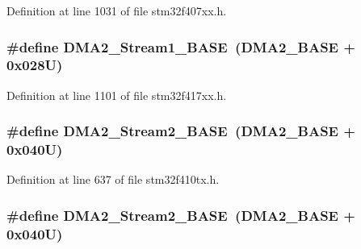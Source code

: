 Definition at line 1031 of file stm32f407xx.\+h.

\subsubsection[{\texorpdfstring{D\+M\+A2\+\_\+\+Stream1\+\_\+\+B\+A\+SE}{DMA2_Stream1_BASE}}]{\setlength{\rightskip}{0pt plus 5cm}\#define D\+M\+A2\+\_\+\+Stream1\+\_\+\+B\+A\+SE~({\bf D\+M\+A2\+\_\+\+B\+A\+SE} + 0x028\+U)}\hypertarget{group___peripheral__registers__structures_ga35512bdc3f5e9df4557c2fbe7935d0b1}{}\label{group___peripheral__registers__structures_ga35512bdc3f5e9df4557c2fbe7935d0b1}


Definition at line 1101 of file stm32f417xx.\+h.

\subsubsection[{\texorpdfstring{D\+M\+A2\+\_\+\+Stream2\+\_\+\+B\+A\+SE}{DMA2_Stream2_BASE}}]{\setlength{\rightskip}{0pt plus 5cm}\#define D\+M\+A2\+\_\+\+Stream2\+\_\+\+B\+A\+SE~({\bf D\+M\+A2\+\_\+\+B\+A\+SE} + 0x040\+U)}\hypertarget{group___peripheral__registers__structures_gaed33a06f08188466f2ede06160984e9a}{}\label{group___peripheral__registers__structures_gaed33a06f08188466f2ede06160984e9a}


Definition at line 637 of file stm32f410tx.\+h.

\subsubsection[{\texorpdfstring{D\+M\+A2\+\_\+\+Stream2\+\_\+\+B\+A\+SE}{DMA2_Stream2_BASE}}]{\setlength{\rightskip}{0pt plus 5cm}\#define D\+M\+A2\+\_\+\+Stream2\+\_\+\+B\+A\+SE~({\bf D\+M\+A2\+\_\+\+B\+A\+SE} + 0x040\+U)}\hypertarget{group___peripheral__registers__structures_gaed33a06f08188466f2ede06160984e9a}{}\label{group___peripheral__registers__structures_gaed33a06f08188466f2ede06160984e9a}


